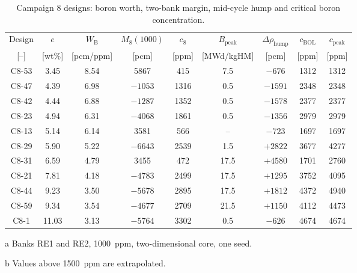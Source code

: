 \begin{table}[htbp]
  \centering
  \small
  \begin{threeparttable}
  \caption{Campaign 8 designs: boron worth, two-bank margin, mid-cycle hump and critical boron concentration.}
  \label{tab:c8-post-boron}
  \setlength{\tabcolsep}{3.6pt}
  \begin{tabular}{@{}ccccccccc@{}}
    \toprule
    Design & $e$ & $W_\mathrm{B}$ & $M_8(1000)$\tnote{a} & $c_8$\tnote{b} &
      $B_\mathrm{peak}$ & $\Delta\rho_\mathrm{hump}$ & $c_\mathrm{BOL}$ &
      $c_\mathrm{peak}$ \\
    {[--]} & [wt\%] & [pcm/ppm] & [pcm] & [ppm] & [MWd/kgHM] & [pcm] &
      [ppm] & [ppm] \\
    \midrule
    C8-53 & 3.45  & 8.54 & 5867    & 415  & 7.5  & $-676$  & 1312 & 1312 \\
    C8-47 & 4.39  & 6.98 & $-1053$ & 1316 & 0.5  & $-1591$ & 2348 & 2348 \\
    C8-42 & 4.44  & 6.88 & $-1287$ & 1352 & 0.5  & $-1578$ & 2377 & 2377 \\
    C8-23 & 4.94  & 6.31 & $-4068$ & 1861 & 0.5  & $-1356$ & 2979 & 2979 \\
    C8-13 & 5.14  & 6.14 & 3581    & 566  & --   & $-723$  & 1697 & 1697 \\
    C8-29 & 5.90  & 5.22 & $-6643$ & 2539 & 1.5  & $+2822$ & 3677 & 4277 \\
    C8-31 & 6.59  & 4.79 & 3455    & 472  & 17.5 & $+4580$ & 1701 & 2760 \\
    C8-21 & 7.81  & 4.18 & $-4783$ & 2499 & 17.5 & $+1295$ & 3752 & 4095 \\
    C8-44 & 9.23  & 3.50 & $-5678$ & 2895 & 17.5 & $+1812$ & 4372 & 4940 \\
    C8-59 & 9.34  & 3.54 & $-4677$ & 2709 & 21.5 & $+1150$ & 4112 & 4473 \\
    C8-1  & 11.03 & 3.13 & $-5764$ & 3302 & 0.5  & $-626$  & 4674 & 4674 \\
    \bottomrule
  \end{tabular}
  \begin{tablenotes}[flushleft]\footnotesize
    \item[a] Banks RE1 and RE2, \SI{1000}{ppm}, two-dimensional core, one seed.
    \item[b] Values above \SI{1500}{ppm} are extrapolated.
  \end{tablenotes}
  \end{threeparttable}
\end{table}

